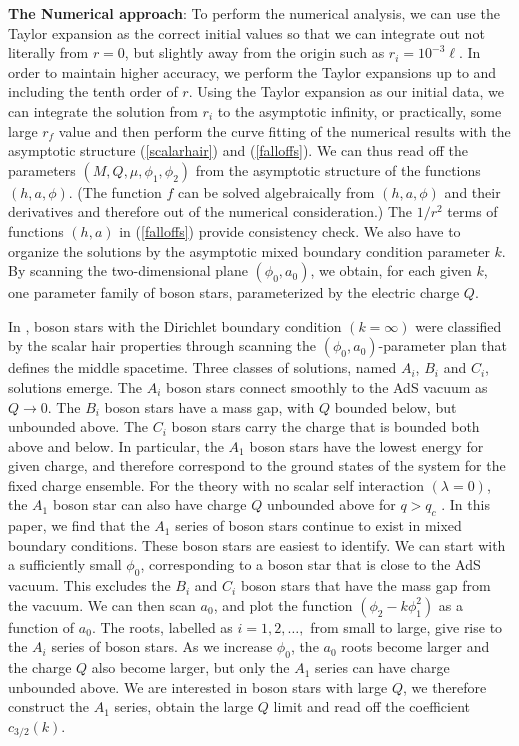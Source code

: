 \documentclass[11pt]{article}
\begin{document}
{\bf The Numerical approach}: To perform the numerical analysis, we can use the Taylor expansion as the correct initial values so that we can integrate out not literally from $r=0$, but slightly away from the origin such as $r_i=10^{-3} \ell$.  In order to maintain higher accuracy, we perform the Taylor expansions up to and including the tenth order of $r$.   Using the Taylor expansion as our initial data, we can integrate the solution from $r_i$ to the asymptotic infinity, or practically, some large $r_f$ value and then perform the curve fitting of the numerical results with the asymptotic structure (\ref{scalarhair}) and (\ref{falloffs}).  We can thus read off the parameters $(M,Q,\mu,\phi_1,\phi_2)$ from
the asymptotic structure of the functions $(h,a,\phi)$. (The function $f$ can be solved algebraically from $(h,a,\phi)$ and their derivatives and therefore out of the numerical consideration.) The $1/r^2$ terms of functions $(h,a)$ in (\ref{falloffs}) provide consistency check. We also have to organize the solutions by the asymptotic mixed boundary condition parameter $k$. By scanning the two-dimensional plane $(\phi_0,a_0)$, we obtain, for each given $k$, one parameter family of boson stars, parameterized by the electric charge $Q$.

In \cite{Liu:2020uaz}, boson stars with the Dirichlet boundary condition $(k=\infty)$ were classified by the scalar hair properties through scanning the $(\phi_0,a_0)$-parameter plan that defines the middle spacetime.  Three classes of solutions, named $A_i$, $B_i$ and $C_i$, solutions emerge. The $A_i$ boson stars connect smoothly to the AdS vacuum as $Q\rightarrow 0$.  The $B_i$ boson stars have a mass gap, with $Q$ bounded below, but unbounded above.  The $C_i$ boson stars carry the charge that is bounded both above and below.  In particular, the $A_1$ boson stars have the lowest energy for given charge, and therefore correspond to the ground states of the system for the fixed charge ensemble.  For the theory with no scalar self interaction $(\lambda=0)$, the $A_1$ boson star can also have charge $Q$ unbounded above for $q>q_c$ \cite{Gentle:2011kv}. In this paper, we find that the $A_1$ series of boson stars continue to exist in mixed boundary conditions. These boson stars are easiest to identify.  We can start with a sufficiently small $\phi_0$, corresponding to a boson star that is close to the AdS vacuum.  This excludes the $B_i$ and $C_i$ boson stars that have the mass gap from the vacuum. We can then scan $a_0$, and plot the function $(\phi_2-k \phi_1^2)$ as a function of $a_0$.  The roots, labelled as $i=1,2,\ldots,$ from small to large, give rise to the $A_i$ series of boson stars. As we increase $\phi_0$, the $a_0$ roots become larger and the charge $Q$ also become larger, but only the $A_1$ series can have charge unbounded above. We are interested in boson stars with large $Q$, we therefore construct the $A_1$ series, obtain the large $Q$ limit and read off the coefficient $c_{3/2}(k)$.
\end{document}
